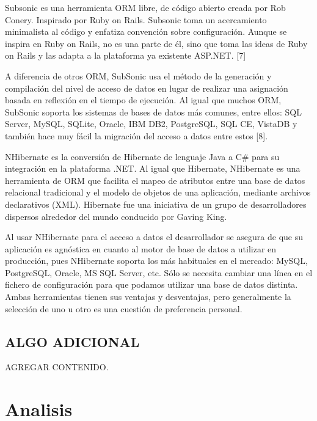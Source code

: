 \documentclass[preprint,12pt]{elsarticle}
\begin{document}
Subsonic es una herramienta ORM libre, de código abierto creada por Rob Conery. Inspirado por Ruby on Rails. Subsonic toma un acercamiento minimalista al código y enfatiza convención sobre configuración. Aunque se inspira en Ruby on Rails, no es una parte de él, sino que toma las ideas de Ruby on Rails y las adapta a la plataforma ya existente ASP.NET. [7]

A diferencia de otros ORM, SubSonic usa el método de la generación y compilación del nivel de acceso de datos en lugar de realizar una asignación basada en reflexión en el tiempo de ejecución. Al igual que muchos ORM, SubSonic soporta los sistemas de bases de datos más comunes, entre ellos: SQL Server, MySQL, SQLite, Oracle, IBM DB2, PostgreSQL, SQL CE, VistaDB y también hace muy fácil la migración del
acceso a datos entre estos [8].

NHibernate es la conversión de Hibernate de lenguaje Java a C# para su integración en la plataforma .NET. Al igual que Hibernate, NHibernate es una herramienta de ORM que facilita el mapeo de atributos entre una base de datos relacional tradicional y el modelo de objetos de una aplicación, mediante archivos declarativos (XML). Hibernate fue una iniciativa de un grupo de desarrolladores dispersos
alrededor del mundo conducido por Gaving King.

Al usar NHibernate para el acceso a datos el desarrollador se asegura de que su aplicación es agnóstica en cuanto al motor de base de datos a utilizar en producción, pues NHibernate soporta los más habituales en el mercado: MySQL, PostgreSQL, Oracle, MS SQL Server, etc. Sólo se necesita cambiar una línea en el fichero de configuración para que podamos utilizar una base de datos distinta. Ambas herramientas tienen sus ventajas y desventajas, pero generalmente la selección de uno u otro es una cuestión de preferencia personal.



\subsection{ALGO ADICIONAL}

AGREGAR CONTENIDO.\cite{referenciaporlles1}




\section{Analisis}
\end{document}
